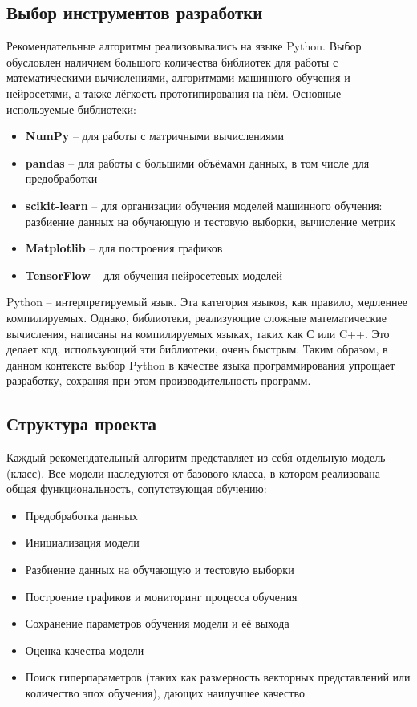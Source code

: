\subsection{Выбор инструментов разработки}\label{subsec:development_tools}
Рекомендательные алгоритмы реализовывались на языке Python\cite{python}.
Выбор обусловлен наличием большого количества библиотек для работы с математическими вычислениями, алгоритмами машинного обучения и нейросетями, а также лёгкость прототипирования на нём.
Основные используемые библиотеки:
\begin{itemize}
    \item \textbf{NumPy}\cite{numpy} -- для работы с матричными вычислениями
    \item \textbf{pandas}\cite{pandas} -- для работы с большими объёмами данных, в том числе для предобработки
    \item \textbf{scikit-learn}\cite{scikit-learn} -- для организации обучения моделей машинного обучения: разбиение данных на обучающую и тестовую выборки, вычисление метрик
    \item \textbf{Matplotlib}\cite{matplotlib} -- для построения графиков
    \item \textbf{TensorFlow}\cite{tensorflow} -- для обучения нейросетевых моделей
\end{itemize}

Python -- интерпретируемый язык.
Эта категория языков, как правило, медленнее компилируемых.
Однако, библиотеки, реализующие сложные математические вычисления, написаны на компилируемых языках, таких как С\cite{c-language} или C++\cite{c++}.
Это делает код, использующий эти библиотеки, очень быстрым.
Таким образом, в данном контексте выбор Python в качестве языка программирования упрощает разработку, сохраняя при этом производительность программ.

\pagebreak
\subsection{Структура проекта}\label{subsec:project_structure}
Каждый рекомендательный алгоритм представляет из себя отдельную модель (класс).
Все модели наследуются от базового класса, в котором реализована общая функциональность, сопутствующая обучению:
\begin{itemize}
    \item Предобработка данных
    \item Инициализация модели
    \item Разбиение данных на обучающую и тестовую выборки
    \item Построение графиков и мониторинг процесса обучения
    \item Сохранение параметров обучения модели и её выхода
    \item Оценка качества модели
    \item Поиск гиперпараметров (таких как размерность векторных представлений или количество эпох обучения), дающих наилучшее качество
\end{itemize}

